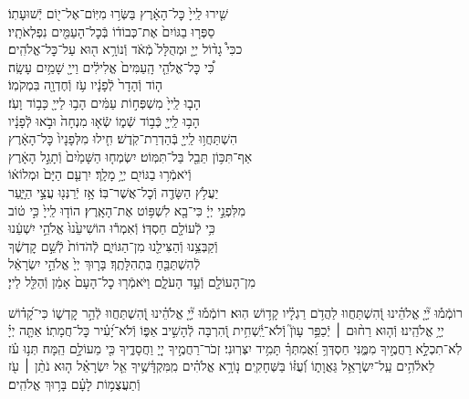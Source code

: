 \documentclass[twoside, openany, parskip=half, 11pt]{book}
\begin{document}
\begin{narrow}
שִׁ֤ירוּ לַֽייָ֙ כׇּל־הָאָ֔רֶץ \hfill בַּשְּׂר֥וּ מִיּֽוֹם־אֶל־י֖וֹם יְֿשׁוּעָתֽוֹ׃\\
סַפְּר֤וּ בַגּוֹיִם֙ אֶת־כְּבוֹד֔וֹ \hfill בְּֿכׇל־הָעַמִּ֖ים נִפְלְאֹתָֽיו׃\\
ככִּי֩ גָד֨וֹל יְיָ֤ וּמְהֻלָּל֙ מְֿאֹ֔ד \hfill וְֿנוֹרָ֥א ה֖וּא עַל־כׇּל־אֱלֹהִֽים׃\\
כִּ֠י כׇּל־אֱלֹהֵ֤י הָֽעַמִּים֙ אֱלִילִ֔ים \hfill וַייָ֖ שָׁמַ֥יִם עָשָֽׂה׃\\
ה֤וֹד וְֿהָדָר֙ לְֿפָנָ֔יו \hfill עֹ֥ז וְֿחֶדְוָ֖ה בִּמְקֹמֽוֹ׃\\
הָב֤וּ לַֽייָ֙ מִשְׁפְּח֣וֹת עַמִּ֔ים \hfill הָב֥וּ לַייָ֖ כָּב֥וֹד וָעֹֽז׃\\
הָב֥וּ לַֽייָ֖ כְּֿב֣וֹד שְֿׁמ֑וֹ \hfill שְֿׂא֤וּ מִנְחָה֙ וּבֹ֣אוּ לְֿפָנָ֔יו\\
הִשְׁתַּחֲו֥וּ לַֽייָ֖ בְּֿהַדְרַת־קֹֽדֶשׁ׃ \hfill חִ֤ילוּ מִלְּפָנָיו֙ כׇּל־הָאָ֔רֶץ\\
אַף־תִּכּ֥וֹן תֵּבֵ֖ל בַּל־תִּמּֽוֹט׃ \hfill יִשְׂמְח֤וּ הַשָּׁמַ֙יִם֙ וְֿתָגֵ֣ל הָאָ֔רֶץ\\
וְֿיֹאמְֿר֥וּ בַגּוֹיִ֖ם יְיָ֥ מָלָֽךְ׃ \hfill יִרְעַ֤ם הַיָּם֙ וּמְלוֹא֔וֹ\\
יַעֲלֹ֥ץ הַשָּׂדֶ֖ה וְֿכׇל־אֲשֶׁר־בּֽוֹ׃ \hfill אָ֥ז יְֿרַנְּנ֖וּ עֲצֵ֣י הַיָּ֑עַר\\
מִלִּפְנֵ֣י יְיָ֔ כִּי־בָ֖א לִשְׁפּ֥וֹט אֶת־הָאָֽרֶץ׃ \hfill הוֹד֤וּ לַֽייָ֙ כִּ֣י ט֔וֹב\\
כִּ֥י לְֿעוֹלָ֖ם חַסְדּֽוֹ׃ \hfill וְֿאִמְר֕וּ הוֹשִׁיעֵ֙נוּ֙ אֱלֹהֵ֣י יִשְׁעֵ֔נוּ\\
וְֿקַבְּצֵ֥נוּ וְֿהַצִּילֵ֖נוּ מִן־הַגּוֹיִ֑ם \hfill לְֿהֹדוֹת֙ לְֿשֵׁ֣ם קׇדְשֶׁ֔ךָ\\
לְֿהִשְׁתַּבֵּ֖חַ בִּתְהִלָּתֶֽךָ׃ \hfill בָּר֤וּךְ יְיָ֙ אֱלֹהֵ֣י יִשְׂרָאֵ֔ל\\
מִן־הָעוֹלָ֖ם וְֿעַ֣ד הָעֹלָ֑ם וַיֹּאמְֿר֤וּ כׇל־הָעָם֙ אָמֵ֔ן \hfill וְֿהַלֵּ֖ל לַייָ׃\\
\end{narrow}

\newcommand{\negline}{\vspace{-\baselineskip}}

\negline

%
רוֹמְֿמ֡וּ יְ֘יָ֤ אֱלֹהֵ֗ינוּ וְֽֿ֭הִשְׁתַּחֲווּ לַהֲדֹ֥ם רַגְלָ֗יו קָד֥וֹשׁ הֽוּא׃ \hfill \break
רוֹמְֿמ֡וּ יְ֘יָ֤ אֱלֹהֵ֗ינוּ וְֽֿ֭הִשְׁתַּחֲווּ לְֿהַ֣ר קׇדְשׁ֑וֹ כִּי־קָ֝ד֗וֹשׁ יְיָ֥ אֱלֹהֵֽינוּ׃ \hfill \break
{}%
וְֿה֤וּא רַח֨וּם ׀ יְֿכַפֵּ֥ר עָוֺן֮ וְֽֿלֹא־יַֽ֫שְׁחִ֥ית וְֿ֭הִרְבָּה לְֿהָשִׁ֣יב אַפּ֑וֹ \hfill \break
וְֿלֹא־יָ֝עִ֗יר כׇּל־חֲמָתֽוֹ׃ \hfill \break
{}%
אַתָּ֤ה יְיָ֗ לֹֽא־תִכְלָ֣א רַחֲמֶ֣יךָ מִמֶּ֑נִּי חַסְדְּךָ֥ וַ֝אֲמִתְּךָ֗ תָּמִ֥יד יִצְּרֽוּנִי׃ \hfill \break
{}זְכֹר־רַחֲמֶ֣יךָ יְיָ֭ וַחֲסָדֶ֑יךָ כִּ֖י מֵעוֹלָ֣ם הֵֽמָּה׃ \hfill \break
{}תְּנ֥וּ עֹ֗ז לֵאלֹ֫הִ֥ים עַֽל־יִשְׂרָאֵ֥ל גַּאֲוָת֑וֹ וְֿ֝עֻזּ֗וֹ בַּשְּׁחָקִֽים׃ \hfill \break
נ֤וֹרָ֥א אֱלֹהִ֗ים מִֽמִּקְדָּ֫שֶׁ֥יךָ אֵ֤ל יִשְׂרָאֵ֗ל \hfill \break
ה֤וּא נֹתֵ֨ן ׀ עֹ֖ז וְֿתַעֲצֻמ֥וֹת לָעָ֗ם בָּר֥וּךְ אֱלֹהִֽים׃ \hfill \break
\end{document}
